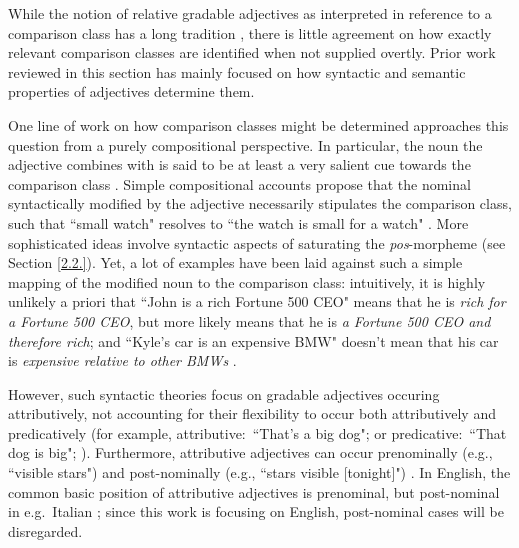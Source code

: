 While the notion of relative gradable adjectives as interpreted in reference to a comparison class has a long tradition \parencite[e.g.,][]{bartsch1972, Bierwisch1989}, there is little agreement on how exactly relevant comparison classes are identified when not supplied overtly. Prior work reviewed in this section has mainly focused on how syntactic and semantic properties of adjectives determine them.

One line of work on how comparison classes might be determined approaches this question from a purely compositional perspective. In particular, the noun the adjective combines with is said to be at least a very salient cue towards the comparison class \parencite{Kamp1975}. 
Simple compositional accounts propose that the nominal syntactically modified by the adjective necessarily stipulates the comparison class, such that ``small watch" resolves to ``the watch is small for a watch" \parencite{Kamp1975, Cresswell1976}. More sophisticated ideas involve syntactic aspects of saturating the \textit{pos}-morpheme (see Section \ref{2.2.}).
Yet, a lot of examples have been laid against such a simple mapping of the modified noun to the comparison class: intuitively, it is highly unlikely a priori that ``John is a rich Fortune 500 CEO" means that he is \emph{rich for a Fortune 500 CEO}, but more likely means that he is \emph{a Fortune 500 CEO and therefore rich}; and ``Kyle’s car is an expensive BMW" doesn’t mean that his car is \emph{expensive relative to other BMWs} \parencite{Kennedy2007}. 

However, such syntactic theories focus on gradable adjectives occuring attributively, not accounting for their flexibility to occur both attributively and predicatively (for example, attributive:~``That’s a big dog"; or predicative:~``That dog is big"; \textcite[cf.][]{mcnally2008, hofherr2010adjectives}). Furthermore, attributive adjectives can occur prenominally (e.g., ``visible stars") and post-nominally (e.g., ``stars visible [tonight]") \parencite{hofherr2010adjectives}. In English, the common basic position of attributive adjectives is prenominal, but post-nominal in e.g.~Italian \parencite{cinque2010}; since this work is focusing on English, post-nominal cases will be disregarded. 
  
